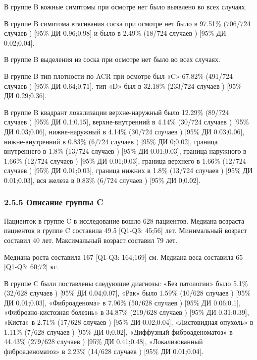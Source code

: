 \documentclass[
]{article}
\begin{document}
В группе B кожные симптомы при осмотре нет было выявлено во всех
случаях.

В группе B симптома втягивания соска при осмотре нет было в 97.51\%
(706/724 случаев ) {[}95\% ДИ 0.96;0.98{]} и было в 2.49\% (18/724
случаев ) {[}95\% ДИ 0.02;0.04{]}.

В группе B выделения из соска при осмотре нет было во всех случаях.

В группе B тип плотности по ACR при осмотре был «C» 67.82\% (491/724
случаев ) {[}95\% ДИ 0.64;0.71{]}, тип «D» был в 32.18\% (233/724
случаев ) {[}95\% ДИ 0.29;0.36{]}.

В группе B квадрант локализации верхне-наружный было 12.29\% (89/724
случаев ) {[}95\% ДИ 0.1;0.15{]}, верхне-внутренний в 4.14\% (30/724
случаев ) {[}95\% ДИ 0.03;0.06{]}, нижне-наружный в 4.14\% (30/724
случаев ) {[}95\% ДИ 0.03;0.06{]}, нижне-внутренний в 0.83\% (6/724
случаев ) {[}95\% ДИ 0;0.02{]}, граница внутреннего в 1.8\% (13/724
случаев ) {[}95\% ДИ 0.01;0.03{]}, граница наружного в 1.66\% (12/724
случаев ) {[}95\% ДИ 0.01;0.03{]}, граница верхнего в 1.66\% (12/724
случаев ) {[}95\% ДИ 0.01;0.03{]}, граница нижних в 1.8\% (13/724
случаев ) {[}95\% ДИ 0.01;0.03{]}, вся железа в 0.83\% (6/724 случаев )
{[}95\% ДИ 0;0.02{]}.

\hypertarget{ux43eux43fux438ux441ux430ux43dux438ux435-ux433ux440ux443ux43fux43fux44b-c}{%
\subsubsection{2.5.5 Описание группы
C}\label{ux43eux43fux438ux441ux430ux43dux438ux435-ux433ux440ux443ux43fux43fux44b-c}}

Пациенток в группе C в исследование вошло 628 пациентов. Медиана
возраста пациенток в группе C составила 49.5 {[}Q1-Q3: 45;56{]} лет.
Минимальный возраст составил 40 лет. Максимальный возраст составил 79
лет.

Медиана роста составила 167 {[}Q1-Q3: 164;169{]} см. Медиана веса
составила 65 {[}Q1-Q3: 60;72{]} кг.

В группе C были поставлены следующие диагнозы: «Без патологии» было
5.1\% (32/628 случаев ) {[}95\% ДИ 0.04;0.07{]}, «Рак» было 1.59\%
(10/628 случаев ) {[}95\% ДИ 0.01;0.03{]}, «Фиброаденома» в 7.96\%
(50/628 случаев ) {[}95\% ДИ 0.06;0.1{]}, «Фиброзно-кистозная болезнь» в
34.87\% (219/628 случаев ) {[}95\% ДИ 0.31;0.39{]}, «Киста» в 2.71\%
(17/628 случаев ) {[}95\% ДИ 0.02;0.04{]}, «Листовидная опухоль» в
1.11\% (7/628 случаев ) {[}95\% ДИ 0;0.02{]}, «Диффузный
фиброаденоматоз» в 44.43\% (279/628 случаев ) {[}95\% ДИ 0.41;0.48{]},
«Локализованный фиброаденоматоз» в 2.23\% (14/628 случаев ) {[}95\% ДИ
0.01;0.04{]}.
\end{document}
